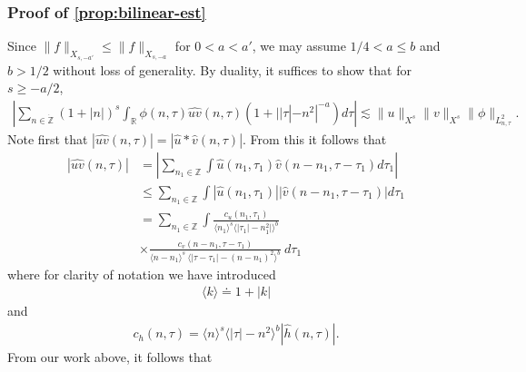 \documentclass[12pt,reqno]{amsart}
\numberwithin{equation}{section}  %
\numberwithin{figure}{section}
\newcommand{\rr}{\mathbb{R}}
\newcommand{\zz}{\mathbb{Z}}
\newcommand{\zzdot}{\dot{\zz}}
\newcommand{\wh}{\widehat}
\theoremstyle{plain}
\theoremstyle{definition}
\theoremstyle{remark}
\begin{document}
\subsubsection{Proof of \autoref{prop:bilinear-est}} 
\label{sssec:proof-bilin-est}
Since $\|f\|_{X_{s,-a'}} \le \|f\|_{X_{s, -a}}$ for $0 < a < a'$, we may assume
$1/4 < a \le b$ and $b > 1/2$ without loss of generality.
By duality, it suffices to show that for $s \ge -a/2$, 
%
\begin{equation}
	\label{duality-est}
	\begin{split}
	|	\sum_{n \in \zzdot}  (1 + |n|)^{s}
		\int_{\rr} \phi(n, \tau) \wh{uv}(n, \tau)(1 
    + | |\tau| - n^{2} |^{-a}) d \tau | \lesssim \|u\|_{X^{s}}
    \|v\|_{X^{s}}
    \|\phi \|_{L^{2}_{n, \tau}}.
	\end{split}
\end{equation}
Note first that $|\wh{uv}(n, \tau) |  = | \wh{u} *  \wh{v} 
(n, \tau)|$. From this it follows that
%
%
\begin{equation}
	\label{non-lin-rep}
	\begin{split}
		| \wh{uv}(n, \tau)|
    & = | \sum_{n_{1} \in \zz }  \int
    \wh{u}\left( n_1,  \tau_1 \right) \wh{v}\left( n - n_1 , \tau - \tau_1   
\right) d \tau_1 |
\\
& \le  \sum_{n_{1} \in \zz }  \int
    |\wh{u}\left( n_1,  \tau_1 \right)| |\wh{v}\left( n - n_1 , \tau - \tau_1   
\right)| d \tau_1 
\\
& = \sum_{n_1 \in \zz } \int \frac{c_u\left( n_1, \tau_1 
\right)}{\langle n_1 \rangle ^s \langle |\tau_1| - n_1^{2} | \rangle ^{b}}
\\
& \times \frac{c_{v}\left( n - n_1, \tau - \tau_1 \right)}{\langle n -
n_1 \rangle ^s\ \langle |\tau - \tau_1 | -  (n - n_1)^{2} \rangle^{b}}
  \ d \tau_1 
\end{split}
\end{equation}
%
%
where for clarity of notation we have introduced 
%
%
%
\begin{equation*}
\begin{split}
\langle k \rangle \doteq 1 + |k|
\end{split}
\end{equation*}
%
%
and
%
\begin{equation*}
	\begin{split}
		c_h(n, \tau) =
			\langle n \rangle ^s \langle |\tau| - n^{2} \rangle ^{b} | \wh{h}\left( n, \tau \right) |.
	\end{split}
\end{equation*}
%
%
From our work above, it follows that 
\end{document}
